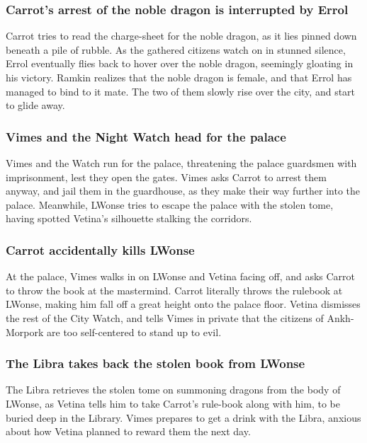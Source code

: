 \subsubsection{\Gls{Carrot}'s arrest of the noble dragon is interrupted by \Gls{Errol}}
\Gls{Carrot} tries to read the charge-sheet for the noble dragon, as it lies pinned down beneath
a pile of rubble. As the gathered citizens watch on in stunned silence, \Gls{Errol} eventually
flies back to hover over the noble dragon, seemingly gloating in his victory. \Gls{Ramkin} realizes
that the noble dragon is female, and that \Gls{Errol} has managed to bind to it mate. The two of
them slowly rise over the city, and start to glide away.

\subsubsection{\Gls{Vimes} and the Night Watch head for the palace}
\Gls{Vimes} and the Watch run for the palace, threatening the palace guardsmen with imprisonment,
lest they open the gates. \Gls{Vimes} asks \Gls{Carrot} to arrest them anyway, and jail them in the
guardhouse, as they make their way further into the palace. Meanwhile, \Gls{LWonse} tries to escape
the palace with the stolen tome, having spotted \Gls{Vetina}'s silhouette stalking the corridors.

\subsubsection{\Gls{Carrot} accidentally kills \Gls{LWonse}}
At the palace, \Gls{Vimes} walks in on \Gls{LWonse} and \Gls{Vetina} facing off, and asks
\Gls{Carrot} to throw the book at the mastermind. \Gls{Carrot} literally throws the rulebook at
\Gls{LWonse}, making him fall off a great height onto the palace floor. \Gls{Vetina} dismisses the
rest of the City Watch, and tells \Gls{Vimes} in private that the citizens of Ankh-Morpork are too
self-centered to stand up to evil.

\subsubsection{The \Gls{Libra} takes back the stolen book from \Gls{LWonse}}
The \Gls{Libra} retrieves the stolen tome on summoning dragons from the body of \Gls{LWonse}, as
\Gls{Vetina} tells him to take \Gls{Carrot}'s rule-book along with him, to be buried deep in the
Library. \Gls{Vimes} prepares to get a drink with the \Gls{Libra}, anxious about how \Gls{Vetina}
planned to reward them the next day.

